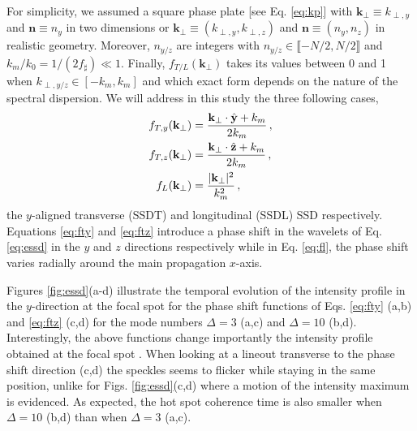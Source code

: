 \documentclass[
 reprint,
 amsmath,amssymb,
 aps,
]{revtex4-1}
\begin{document}
 For simplicity, we  assumed a square phase plate [see Eq. \eqref{eq:kp}] with $\mathbf{k}_{\perp }\equiv k_{\perp,y}$ and $\mathbf{n}\equiv n_y$ in two dimensions or  $\mathbf{k}_{\perp }\equiv (k_{\perp,y},k_{\perp,z}) $ and $\mathbf{n}\equiv (n_y,n_z)$ in  realistic geometry. Moreover,   $n_{y/z}$ are integers with $n_{y/z}\in \llbracket - N/2 ,N/2 \rrbracket$ and $k_m/k_0 =1/(2f_\sharp)\ll 1$.
 Finally, $f_{T/L}(\mathbf{k}_\perp)$  takes its values between 0 and 1 when $k_{\perp,y/z}\in [-k_m , k_m]$ and which exact form depends on the nature of the spectral dispersion. We will address in this study the three following cases, 
\begin{align}
 f_{T,y}(\mathbf{k}_\perp)&=\frac{\mathbf{k}_\perp\cdot \Hat{\mathbf{y}}+k_m}{2k_m} \label{eq:fty} \, , \\
 f_{T,z}(\mathbf{k}_\perp)&=\frac{\mathbf{k}_\perp\cdot \Hat{\mathbf{z}}+k_m}{2k_m} \label{eq:ftz} \, , \\
f_L(\mathbf{k}_\perp)&=\frac{\vert \mathbf{k}_\perp\vert^2}{k_m^2} \label{eq:fl} \, ,
\end{align}
the $y$-aligned transverse (SSDT) and longitudinal (SSDL) SSD respectively. Equations \eqref{eq:fty} and  \eqref{eq:ftz}  introduce a phase shift in  the wavelets  of Eq. \eqref{eq:essd} in the $y$ and $z$ directions respectively while in Eq. \eqref{eq:fl}, the phase shift varies radially around the main propagation $x$-axis.

Figures \ref{fig:essd}(a-d) illustrate the temporal evolution of the intensity profile in the $y$-direction  at the focal spot for the phase shift functions of  Eqs. \eqref{eq:fty} (a,b) and  \eqref{eq:ftz} (c,d) for  the mode numbers $\Delta=3$ (a,c) and $\Delta=10$ (b,d).  Interestingly,  the above functions change importantly the  intensity profile obtained at the focal spot \cite[]{phd-Duluc,POP_Duluc_2019}. When looking at a lineout transverse to the phase shift direction (c,d) the speckles seems to flicker while staying in the same position, unlike for Figs. \ref{fig:essd}(c,d) where a motion of the intensity maximum is evidenced. As expected, the hot spot coherence time is also smaller when $\Delta=10$ (b,d) than  when $\Delta=3$ (a,c).
 
\end{document}
